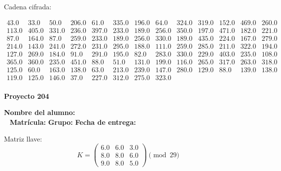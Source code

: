\documentclass[12pt]{article}
\begin{document}
Cadena cifrada:
\begin{center}
$\begin{array}{lllllllllllll}
43.0 & 33.0 & 50.0 & 206.0 & 61.0 & 335.0 & 196.0 & 64.0 & 324.0 & 319.0 & 152.0 & 469.0 & 260.0\\
113.0 & 405.0 & 331.0 & 236.0 & 397.0 & 233.0 & 189.0 & 256.0 & 350.0 & 197.0 & 471.0 & 182.0 & 221.0\\
87.0 & 164.0 & 87.0 & 259.0 & 233.0 & 189.0 & 256.0 & 330.0 & 189.0 & 435.0 & 224.0 & 167.0 & 279.0\\
214.0 & 143.0 & 241.0 & 272.0 & 231.0 & 295.0 & 188.0 & 111.0 & 259.0 & 285.0 & 211.0 & 322.0 & 194.0\\
127.0 & 269.0 & 184.0 & 91.0 & 291.0 & 195.0 & 82.0 & 283.0 & 330.0 & 229.0 & 403.0 & 235.0 & 108.0\\
365.0 & 360.0 & 235.0 & 451.0 & 88.0 & 51.0 & 131.0 & 199.0 & 116.0 & 265.0 & 317.0 & 263.0 & 318.0\\
125.0 & 60.0 & 163.0 & 138.0 & 63.0 & 213.0 & 239.0 & 147.0 & 280.0 & 129.0 & 88.0 & 139.0 & 138.0\\
119.0 & 125.0 & 146.0 & 37.0 & 227.0 & 312.0 & 275.0 & 323.0\\
\end{array}$
\end{center}

\newpage


\textbf{Proyecto 204}

\textbf{Nombre del alumno:} \underline{\hspace{13cm}}\\\
\vspace{1cm}
\textbf{Matrícula:} \underline{\hspace{4cm}} \hspace{1cm}
\textbf{Grupo:} \underline{\hspace{2cm}}
\textbf{Fecha de entrega:} \underline{\hspace{2cm}}

\medskip

Matriz llave:
\[
K = \begin{pmatrix}
6.0 & 6.0 & 3.0\\
8.0 & 8.0 & 6.0\\
9.0 & 8.0 & 5.0
\end{pmatrix} \pmod{29}
\]
\end{document}
